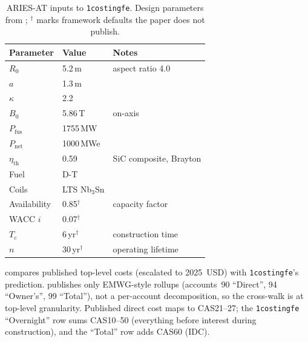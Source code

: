 \documentclass{article}
\begin{document}
\begin{table}[h]
\centering
\caption{ARIES-AT inputs to \texttt{1costingfe}. Design parameters from
\citet{najmabadi2006ariesat}; $^\dagger$ marks framework defaults the paper
does not publish.}
\label{tab:aries-inputs}
\begin{tabular}{lll}
\toprule
Parameter & Value & Notes \\
\midrule
$R_0$ & 5.2\,m & aspect ratio 4.0 \\
$a$ & 1.3\,m & \\
$\kappa$ & 2.2 & \\
$B_0$ & 5.86\,T & on-axis \\
$P_\text{fus}$ & 1755\,MW & \\
$P_\text{net}$ & 1000\,MWe & \\
$\eta_\text{th}$ & 0.59 & SiC composite, Brayton \\
Fuel & D-T & \\
Coils & LTS Nb$_3$Sn & \\
\midrule
Availability & 0.85$^\dagger$ & capacity factor \\
WACC $i$ & 0.07$^\dagger$ & \\
$T_c$ & 6\,yr$^\dagger$ & construction time \\
$n$ & 30\,yr$^\dagger$ & operating lifetime \\
\bottomrule
\end{tabular}
\end{table}

 compares published top-level costs
(escalated to 2025~USD) with \texttt{1costingfe}'s prediction.
\citet{najmabadi2006ariesat} publishes only EMWG-style rollups
(accounts~90 ``Direct'', 94 ``Owner's'', 99 ``Total''), not a per-account
decomposition, so the cross-walk is at top-level granularity. Published
direct cost maps to CAS21--27; the \texttt{1costingfe} ``Overnight'' row
sums CAS10--50 (everything before interest during construction), and the
``Total'' row adds CAS60 (IDC).
\end{document}
